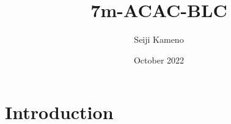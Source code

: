 \documentclass{article}
\title{7m-ACAC-BLC}
\author{Seiji Kameno}
\date{October 2022}
\begin{document}
\maketitle

\section{Introduction}
\end{document}

